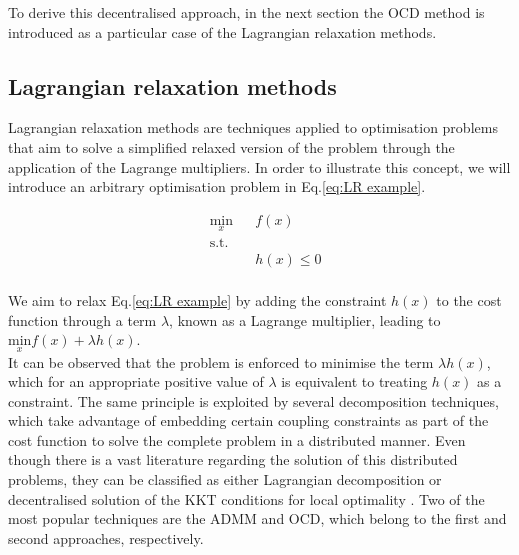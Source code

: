 \documentclass[letterpaper, 10 pt, conference]{ieeeconf}  %
\begin{document}
To derive this decentralised approach, in the next section the OCD method is introduced as a particular case of the Lagrangian relaxation methods.


\subsection{Lagrangian relaxation methods}
Lagrangian relaxation methods are techniques applied to optimisation problems that aim to solve a simplified relaxed version of the problem through the application of the Lagrange multipliers. In order to illustrate this concept, we will introduce an arbitrary optimisation problem in  Eq.\eqref{eq:LR example}.

\begin{equation}
\label{eq:LR example}
\begin{aligned}
    & \underset{x}{\text{min}} &&f(x) \\
    & \text{s.t.}\\
    & && h(x) \leq 0 \\
\end{aligned}
\end{equation}

We aim to relax   Eq.\eqref{eq:LR example} by adding the constraint $h(x)$ to the cost function through a term $\lambda$, known as a Lagrange multiplier, leading to $\underset{x}{\text{min}}f(x) + \lambda h(x)$.\\ 

It can be observed that the problem is enforced to minimise the term $\lambda h(x)$, which for an appropriate positive value of $\lambda$ is equivalent to treating $h(x)$ as a constraint. The same principle is exploited by several decomposition techniques, which take advantage of embedding certain coupling constraints as part of the cost function to solve the complete problem in a distributed manner. Even though there is a vast literature regarding the solution of this distributed problems, they can be classified as either Lagrangian decomposition or decentralised solution of the KKT conditions for local optimality \cite{kargarian2016toward}. Two of the most popular techniques are the ADMM and OCD, which belong to the first and second approaches, respectively. \\ 
\end{document}
